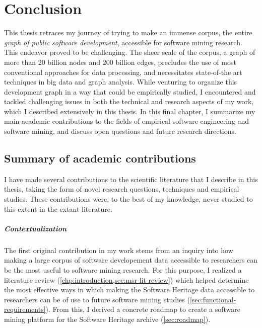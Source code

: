 \chapter{Conclusion}

This thesis retraces my journey of trying to make an immense corpus, the
entire \emph{graph of public software development}, accessible for software
mining research. This endeavor proved to be challenging. The sheer scale of the
corpus, a graph of more than 20 billion nodes and 200 billion edges, precludes
the use of most conventional approaches for data processing, and necessitates
state-of-the art techniques in big data and graph analysis.
While venturing to organize this development graph in a way that could be
empirically studied, I encountered and tackled challenging issues in both the
technical and research aspects of my work, which I described extensively in
this thesis. In this final chapter, I summarize my main academic contributions
to the fields of empirical software engineering and software mining, and
discuss open questions and future research directions.

\section{Summary of academic contributions}

I have made several contributions to the scientific literature that I describe
in this thesis, taking the form of novel research questions, techniques and
empirical studies. These contributions were, to the best of my knowledge, never
studied to this extent in the extant literature.

\paragraph*{Contextualization}

The first original contribution in my work stems from an inquiry into how
making a large corpus of software developement data accessible to researchers
can be the most useful to software mining research. For this purpose, I
realized a literature review (\cref{chp:introduction,sec:msr-lit-review}) which
helped determine the most effective ways in which making the Software Heritage
data accessible to researchers can be of use to future software mining studies
(\cref{sec:functional-requirements}). From this, I derived a concrete roadmap
to create a software mining platform for the Software Heritage archive
(\cref{sec:roadmap}).

